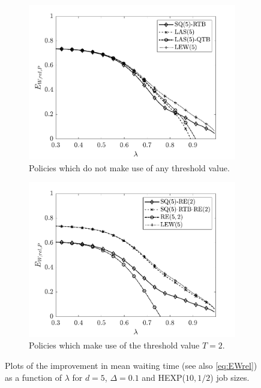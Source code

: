 \documentclass[12pt]{report}
\begin{document}
\begin{figure}[t]
\begin{center}
\begin{subfigure}{0.43\textwidth}
\centering
\captionsetup{width=.8\linewidth}
\includegraphics[width=1\linewidth]{figures/Chapter7/fig2a.pdf}
\caption{Policies which do not make use of any threshold value.}
\label{fig2a}
\end{subfigure}
\begin{subfigure}{.43\textwidth}
\centering
\captionsetup{width=.8\linewidth}
\includegraphics[width=1\linewidth]{figures/Chapter7/fig2b.pdf}
\caption{Policies which make use of the threshold value $T=2$.}
\label{fig2b}
\end{subfigure}
\caption{Plots of the improvement in mean waiting time (see also \eqref{eq:EWrel}) as a function of $\lambda$ for $d=5$, $\Delta=0.1$ and HEXP($10,1/2$) job sizes.}
\label{fig2}
\end{center}
\end{figure}
\end{document}
